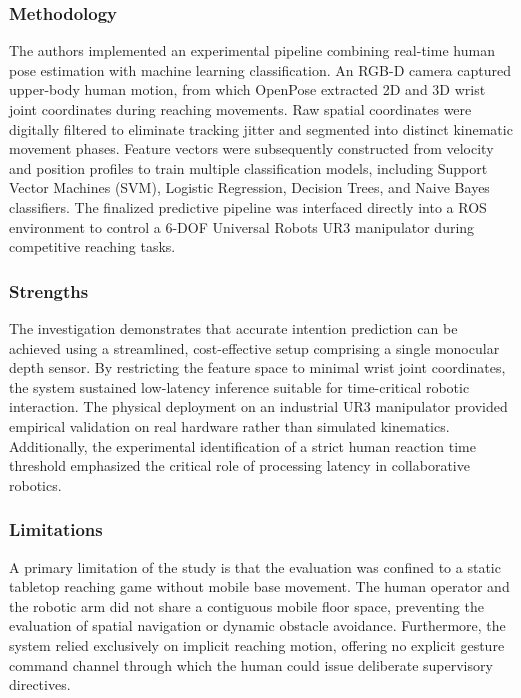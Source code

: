 \subsubsection{Methodology}
The authors implemented an experimental pipeline combining real-time human pose estimation with machine learning classification. An RGB-D camera captured upper-body human motion, from which OpenPose extracted 2D and 3D wrist joint coordinates during reaching movements. Raw spatial coordinates were digitally filtered to eliminate tracking jitter and segmented into distinct kinematic movement phases. Feature vectors were subsequently constructed from velocity and position profiles to train multiple classification models, including Support Vector Machines (SVM), Logistic Regression, Decision Trees, and Naive Bayes classifiers. The finalized predictive pipeline was interfaced directly into a ROS environment to control a 6-DOF Universal Robots UR3 manipulator during competitive reaching tasks.

\subsubsection{Strengths}
The investigation demonstrates that accurate intention prediction can be achieved using a streamlined, cost-effective setup comprising a single monocular depth sensor. By restricting the feature space to minimal wrist joint coordinates, the system sustained low-latency inference suitable for time-critical robotic interaction. The physical deployment on an industrial UR3 manipulator provided empirical validation on real hardware rather than simulated kinematics. Additionally, the experimental identification of a strict human reaction time threshold emphasized the critical role of processing latency in collaborative robotics.

\subsubsection{Limitations}
A primary limitation of the study is that the evaluation was confined to a static tabletop reaching game without mobile base movement. The human operator and the robotic arm did not share a contiguous mobile floor space, preventing the evaluation of spatial navigation or dynamic obstacle avoidance. Furthermore, the system relied exclusively on implicit reaching motion, offering no explicit gesture command channel through which the human could issue deliberate supervisory directives.

